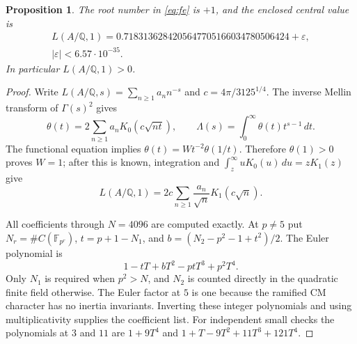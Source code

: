 \documentclass[11pt]{article}
\newcommand{\Q}{\mathbb Q}
\newcommand{\F}{\mathbb F}
\numberwithin{equation}{section}
\newtheorem{proposition}[theorem]{Proposition}
\theoremstyle{definition}
\begin{document}
\begin{proposition}\label{prop:lvalue}
The root number in \eqref{eq:fe} is $+1$, and the enclosed central value is
\begin{equation}
\begin{gathered}
L(A/\Q,1)=0.7183136284205647705166034780506424+\varepsilon,\\
|\varepsilon|<6.57\cdot10^{-35}.
\end{gathered}
\label{eq:lvalue}
\end{equation}
In particular $L(A/\Q,1)>0$.
\end{proposition}

\begin{proof}
Write $L(A/\Q,s)=\sum_{n\geq1}a_nn^{-s}$ and
$c=4\pi/3125^{1/4}$. The inverse Mellin transform of $\Gamma(s)^2$
gives
\[
\theta(t)=2\sum_{n\geq1}a_nK_0(c\sqrt{nt}),\qquad
\Lambda(s)=\int_0^\infty\theta(t)t^{s-1}\,dt.
\]
The functional equation implies $\theta(t)=Wt^{-2}\theta(1/t)$.
Therefore $\theta(1)>0$ proves $W=1$; after this is known, integration
and $\int_z^\infty uK_0(u)\,du=zK_1(z)$ give
\begin{equation}
L(A/\Q,1)=2c\sum_{n\geq1}\frac{a_n}{\sqrt n}K_1(c\sqrt n).
\label{eq:central}
\end{equation}

All coefficients through $N=4096$ are computed exactly. At $p\ne5$
put $N_r=\#C(\F_{p^r})$, $t=p+1-N_1$, and
$b=(N_2-p^2-1+t^2)/2$. The Euler polynomial is
\begin{equation}
1-tT+bT^2-ptT^3+p^2T^4.
\end{equation}
Only $N_1$ is required when $p^2>N$, and $N_2$ is counted directly in
the quadratic finite field otherwise. The Euler factor at $5$ is one
because the ramified CM character has no inertia invariants. Inverting
these integer polynomials and using multiplicativity supplies the
coefficient list. For independent small checks the polynomials at
$3$ and $11$ are $1+9T^4$ and $1+T-9T^2+11T^3+121T^4$.


\end{proof}
\end{document}

